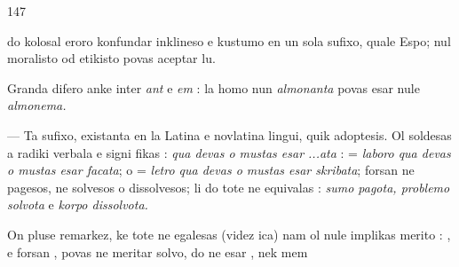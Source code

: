 \begin{VUpage}[151]{147}

\VUcontinue
do kolosal eroro konfundar inklineso e kustumo en un sola\nl
sufixo, quale Espo; nul moralisto od etikisto povas aceptar lu.\parplein

Granda difero anke inter \textit{ant} e \textit{em} : la homo nun \textit{almonanta}\nl
povas esar nule \textit{almonema.}

 --- Ta sufixo, existanta en la Latina e novlatina\nl
lingui, quik adoptesis. Ol soldesas a radiki verbala e signi\cc
fikas : \textit{qua devas o mustas esar ...ata} :  =\nl
\textit{laboro qua devas o mustas esar facata};  o \cc
{} = \textit{letro qua devas o mustas esar skribata}; \nl
{} forsan ne\nl
pagesos, ne solvesos o dissolvesos; li do tote ne equivalas :\nl
\textit{sumo pagota, problemo solvota} e \textit{korpo dissolvota.}

On pluse remarkez, ke  tote ne egalesas  (videz\nl
ica) nam ol nule implikas merito : , e\nl
forsan , povas ne meritar solvo, do ne esar ,\nl
nek mem 


\end{VUpage}
